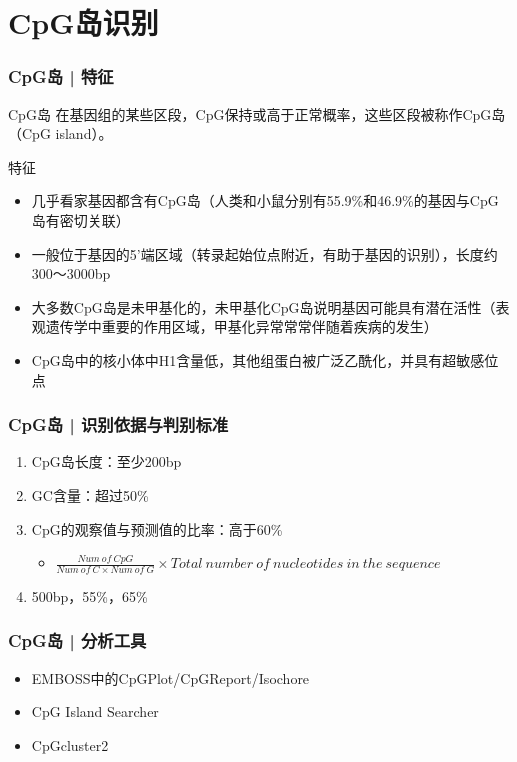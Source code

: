 \section{CpG岛识别}
\begin{frame}
  \frametitle{CpG岛 | 特征}
  \begin{block}{\alert{CpG岛}}
    在基因组的某些区段，CpG保持或高于正常概率，这些区段被称作CpG岛（CpG island）。
  \end{block}
  \pause
  \begin{block}{特征}
    \begin{itemize}
      \item 几乎看家基因都含有CpG岛（人类和小鼠分别有55.9\%和46.9\%的基因与CpG岛有密切关联）
      \item 一般位于基因的5'端区域（转录起始位点附近，有助于基因的识别），长度约300～3000bp
      \item 大多数CpG岛是未甲基化的，未甲基化CpG岛说明基因可能具有潜在活性（表观遗传学中重要的作用区域，甲基化异常常常伴随着疾病的发生）
      \item CpG岛中的核小体中H1含量低，其他组蛋白被广泛乙酰化，并具有超敏感位点
    \end{itemize}
  \end{block}
\end{frame}

\begin{frame}
  \frametitle{CpG岛 | \alert{识别依据与判别标准}}
  \begin{enumerate}
    \item CpG岛长度：至少200bp
    \item GC含量：超过50\%
    \item CpG的观察值与预测值的比率：高于60\%
      \begin{itemize}
        \item $\frac{Num\ of\ CpG}{Num\ of\ C \times Num\ of\ G} \times Total\ number\ of\ nucleotides\ in\ the\ sequence$
      \end{itemize}
    \pause
    \item 500bp，55\%，65\%
  \end{enumerate}
\end{frame}

\begin{frame}
  \frametitle{CpG岛 | 分析工具}
  \begin{itemize}
    \item EMBOSS中的CpGPlot/CpGReport/Isochore
    \item CpG Island Searcher
    \item CpGcluster2
  \end{itemize}
\end{frame}


